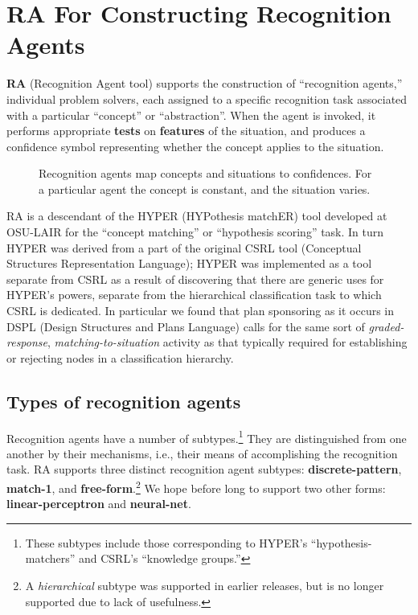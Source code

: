\section{RA For Constructing Recognition Agents}

{\bf RA} (Recognition Agent tool) supports the construction of
``recognition agents,'' individual problem solvers, each assigned to a
specific recognition task associated with a particular ``concept'' or
``abstraction''.  When the agent is invoked, it performs appropriate
{\bf tests} on {\bf features} of the situation, and produces a confidence
symbol representing whether the concept applies to the situation.

\begin{figure}
\vspace{7.0cm}
\caption{Recognition agents map concepts and situations to
confidences.  For a particular agent the concept is constant,
and the situation varies.}
\end{figure}

RA is a descendant of the HYPER (HYPothesis matchER) tool developed at
OSU-LAIR for the ``concept matching'' or ``hypothesis scoring'' task.
In turn HYPER was derived from a part of the original CSRL tool
(Conceptual Structures Representation Language); HYPER was implemented
as a tool separate from CSRL as a result of discovering that there are
generic uses for HYPER's powers, separate from the hierarchical
classification task to which CSRL is dedicated.  In particular we
found that plan sponsoring as it occurs in DSPL (Design Structures and
Plans Language) calls for the same sort of {\em graded-response\/},
{\em matching-to-situation\/} activity as that typically required for
establishing or rejecting nodes in a classification hierarchy.



\subsection{Types of recognition agents}

Recognition agents have a number of subtypes.\footnote{These subtypes
include those corresponding to HYPER's ``hypothesis-matchers'' and CSRL's
``knowledge groups.''}  They are distinguished from one another by their
mechanisms, i.e., their means of accomplishing the recognition task.
RA supports three distinct recognition agent subtypes:
{\bf discrete-pattern}, {\bf match-1}, and
{\bf free-form}.\footnote{A {\it hierarchical} subtype was supported
in earlier releases, but is no longer supported due to lack of
usefulness.}
We hope before long to support two other forms:
{\bf linear-perceptron} and {\bf neural-net}.

